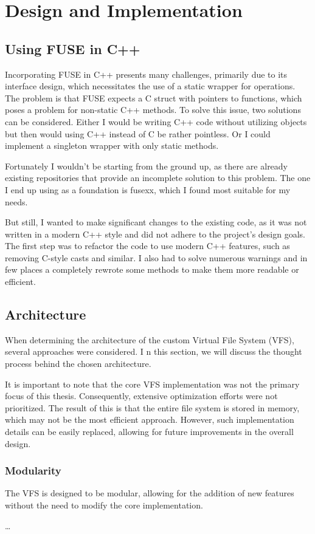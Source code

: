 \chapter{Design and Implementation}
\label{chap:design-and-architecture}

\section{Using FUSE in C++}\label{sec:fuse-in-cpp}

Incorporating FUSE in C++ presents many challenges, primarily due to its interface design, which necessitates the use of a static wrapper for operations.
The problem is that FUSE expects a C struct with pointers to functions, which poses a problem for non-static C++ methods.
To solve this issue, two solutions can be considered.
Either I would be writing C++ code without utilizing objects but then would using C++ instead of C be rather pointless.
Or I could implement a singleton wrapper with only static methods.

Fortunately I wouldn't be starting from the ground up, as there are already existing repositories that provide an incomplete solution to this problem.
The one I end up using as a foundation is fusexx, which I found most suitable for my needs.

But still, I wanted to make significant changes to the existing code, as it was not written in a modern C++ style and did not adhere to the project's design goals.
The first step was to refactor the code to use modern C++ features, such as removing C-style casts and similar.
I also had to solve numerous warnings and in few places a completely rewrote some methods to make them more readable or efficient.


\section{Architecture}\label{sec:architecture}

When determining the architecture of the custom Virtual File System (VFS), several approaches were considered. I
n this section, we will discuss the thought process behind the chosen architecture.

It is important to note that the core VFS implementation was not the primary focus of this thesis.
Consequently, extensive optimization efforts were not prioritized.
The result of this is that the entire file system is stored in memory, which may not be the most efficient approach.
However, such implementation details can be easily replaced, allowing for future improvements in the overall design.

\subsection{Modularity}

The VFS is designed to be modular, allowing for the addition of new features without the need to modify the core implementation.

\ldots